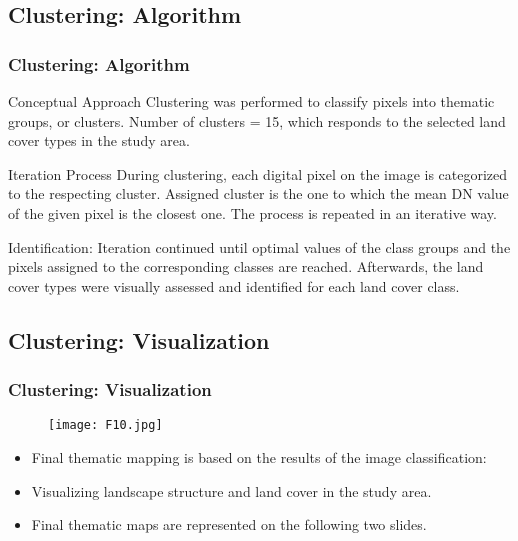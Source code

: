 \documentclass[pdflatex,compress,8pt,
	xcolor={dvipsnames,dvipsnames,svgnames,x11names,table},
	hyperref={colorlinks = true,
	breaklinks = true, 
	urlcolor = NavyBlue, 
	breaklinks = true}]{beamer}
\begin{document}
\subsection{Clustering: Algorithm}
\begin{frame}\frametitle{Clustering: Algorithm}

\begin{alertblock}{Conceptual Approach}
Clustering was performed to classify pixels into thematic groups, or clusters. Number of clusters = 15, which responds to the selected land cover types in the study area.
\end{alertblock}

\begin{block}{Iteration Process}
During clustering, each digital pixel on the image is categorized to the respecting cluster. Assigned cluster is the one to which the mean DN value of the given pixel is the closest one. The process is repeated in an iterative way.
\end{block}

\begin{examples}{Identification:}
Iteration continued until optimal values of the class groups and the pixels assigned to the corresponding classes are reached. Afterwards, the land cover types were visually assessed and identified for each land cover class.
\end{examples}

\end{frame}

\subsection{Clustering: Visualization}
\begin{frame}\frametitle{Clustering: Visualization}
\begin{figure}[H]
	\centering
		\texttt{[image: F10.jpg]}
\end{figure}
\begin{itemize}
	\item Final thematic mapping is based on the results of the image classification: 
	\item Visualizing landscape structure and land cover in the study area.
	\item Final thematic maps are represented on the following two slides.
\end{itemize}
\end{frame}
\end{document}
